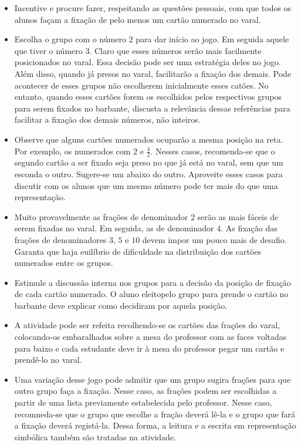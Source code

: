 \begin{multicols}{2}
\begin{itemize}
  \item Incentive e procure fazer, respeitando as questões pessoais, com que todos os alunos façam a fixação de pelo menos um cartão numerado no varal. 
  \item Escolha o grupo com o número $2$ para dar início ao jogo. Em seguida aquele que tiver o número 3. Claro que esses números serão mais facilmente posicionados no varal. Essa decisão pode ser uma estratégia deles no jogo. Além disso, quando já presos no varal, facilitarão a fixação dos demais. Pode acontecer de esses grupos não escolherem inicialmente esses catões. No entanto, quando esses cartões forem os escolhidos pelos respectivos grupos para serem fixados no barbante, discusta a relevância dessas referências para facilitar a fixação dos demais números, não inteiros.      
  \item Observe que alguns cartões numerados ocuparão a mesma posição na reta. Por exemplo, os numerados com $2$ e $\frac{4}{2}$. Nesses casos, recomenda-se que o segundo cartão a ser fixado seja preso no que já está no varal, sem que um esconda o outro. Sugere-se um abaixo do outro. Aproveite esses casos para discutir com os alunos que um mesmo número pode ter mais do que uma representação.
  \item Muito provavelmente as frações de denominador $2$ serão as mais fáceis de serem fixadas no varal. Em seguida, as de denominador $4$. As fixação das frações de denominadores $3$, $5$ e $10$ devem impor um pouco mais de desafio. Garanta que haja euilíbrio de dificuldade na distribuição dos cartões numerados entre os grupos.
  \item Estimule a discussão interna nos grupos para a decisão da posição de fixação de cada cartão numerado. O aluno eleitopelo grupo para prende o cartão no barbante deve explicar como decidiram por aquela posição.
  \item A atividade pode ser refeita recolhendo-se os cartões das frações do varal, colocando-os embaralhados sobre a mesa do professor com as faces voltadas para baixo e cada estudante deve ir à mesa do professor pegar um cartão e prendê-lo no varal.
  \item Uma variação desse jogo pode admitir que um grupo sugira frações para que outro grupo faça a fixação. Nesse caso, as frações podem ser escolhidas a partir de uma lista previamente estabelecida pelo professor. Nesse caso, recomneda-se que o grupo que escolhe a fração deverá lê-la e o grupo que fará a fixação deverá registá-la. Dessa forma, a leitura e a escrita em representação simbólica também são tratadas na atividade.
\end{itemize} %


\end{multicols}
